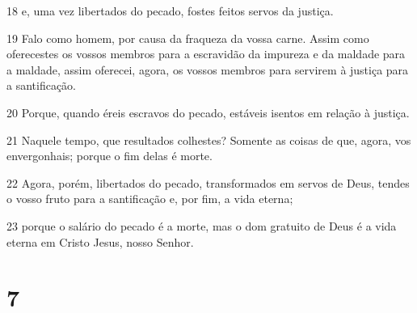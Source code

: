 \par 18 e, uma vez libertados do pecado, fostes feitos servos da justiça.
\par 19 Falo como homem, por causa da fraqueza da vossa carne. Assim como oferecestes os vossos membros para a escravidão da impureza e da maldade para a maldade, assim oferecei, agora, os vossos membros para servirem à justiça para a santificação.
\par 20 Porque, quando éreis escravos do pecado, estáveis isentos em relação à justiça.
\par 21 Naquele tempo, que resultados colhestes? Somente as coisas de que, agora, vos envergonhais; porque o fim delas é morte.
\par 22 Agora, porém, libertados do pecado, transformados em servos de Deus, tendes o vosso fruto para a santificação e, por fim, a vida eterna;
\par 23 porque o salário do pecado é a morte, mas o dom gratuito de Deus é a vida eterna em Cristo Jesus, nosso Senhor.

\chapter{7}

